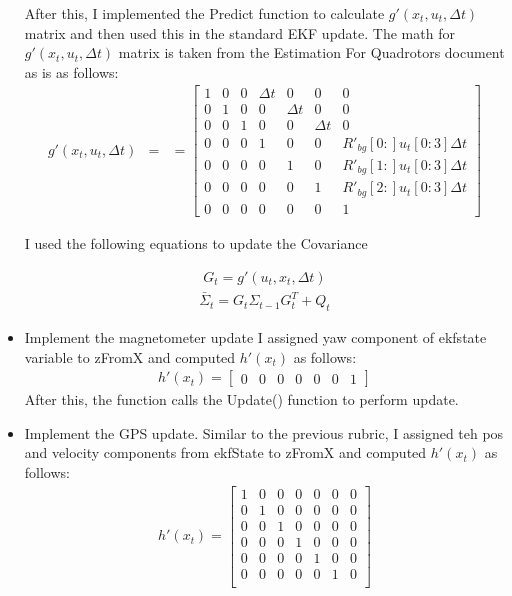 \documentclass{article}
\begin{document}
\begin{itemize}
After this, I implemented the Predict function to calculate $g'(x_t, u_t, \Delta t)$ matrix and then used this in the standard EKF update. 
The math for $g'(x_t, u_t, \Delta t)$ matrix is taken from the Estimation For Quadrotors document as is as follows:
\begin{align}
  g'(x_t, u_t, \Delta t) &= 
&= \left [ \begin{array}{ccccccc}
      1 & 0 & 0 & \Delta t & 0 & 0 & 0\\
      0 & 1 & 0 & 0 & \Delta t & 0 & 0\\
      0 & 0 & 1 & 0 & 0 & \Delta t & 0\\
      0 & 0 & 0 & 1 & 0 & 0 & R'_{bg}[0:]u_t[0:3] \Delta t\\
      0 & 0 & 0 & 0 & 1  & 0 & R'_{bg}[1:]u_t[0:3] \Delta t\\
      0 & 0 & 0 & 0 & 0 & 1 &  R'_{bg}[2:]u_t[0:3] \Delta t\\
      0 & 0 & 0 & 0 & 0 & 0 & 1
    \end{array}
    \right]
\end{align}

I used the following equations to update the Covariance

\begin{align}
G_t = g'(u_t, x_t, \Delta t)
\end{align}
\begin{align}
\bar{\Sigma}_t = G_t\Sigma_{t-1}G_t^T + Q_t
\end{align}
\item Implement the magnetometer update
I assigned yaw component of ekfstate variable to zFromX and computed $h'(x_{t})$ as follows:
\begin{align}
  h'(x_t) = \left[\begin{array}{ccccccc}
      0&0&0&0&0&0&1
      \end{array}\right]
\end{align}
After this, the function calls the Update() function to perform update.

\item Implement the GPS update.
Similar to the previous rubric, I assigned teh pos and velocity components from ekfState to zFromX and computed $h'(x_{t})$ as follows:
\begin{align}
  h'(x_t) = \left[\begin{array}{ccccccc}
      1&0&0&0&0&0&0\\
      0&1&0&0&0&0&0\\
      0&0&1&0&0&0&0\\
      0&0&0&1&0&0&0\\
      0&0&0&0&1&0&0\\
      0&0&0&0&0&1&0\\                  
      \end{array}\right]
\end{align}
\end{itemize}
\end{document}
